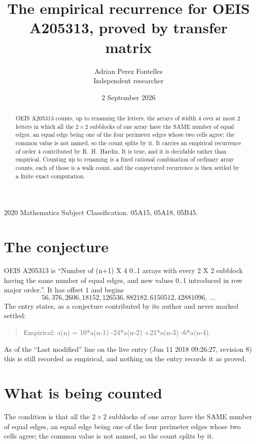 \documentclass[11pt,a4paper]{article}
\title{The empirical recurrence for OEIS A205313, proved by transfer matrix}
\author{Adrian Perez Fontelles\\ \small Independent researcher}
\date{2 September 2026}
\theoremstyle{plain}
\theoremstyle{definition}
\begin{document}
\maketitle

\begin{abstract}
OEIS A205313 counts, up to renaming the letters, the arrays of width $4$ over at most $2$
letters in which all the $2\times2$ subblocks of one array have the SAME number of equal edges, an equal edge being one of the four perimeter edges whose two cells agree; the common value is not named, so the count splits by it. It carries an empirical recurrence of order $4$ contributed by
R.~H.~Hardin. It is true, and it is decidable rather than empirical. Counting up to renaming is
a fixed rational combination of ordinary array counts, each of those is a walk count, and the
conjectured recurrence is then settled by a finite exact computation.
\end{abstract}

\noindent\small 2020 Mathematics Subject Classification. 05A15, 05A18, 05B45.\normalsize

\section{The conjecture}

OEIS A205313 is ``Number of (n+1) X 4 0..1 arrays with every 2 X 2 subblock having the same number of equal edges, and new values 0..1 introduced in row major order.''. It has offset $1$ and begins
\[
56, 376, 2606, 18152, 126536, 882182, 6150512, 42881096,\ \dots
\]
The entry states, as a conjecture contributed by its author and never marked settled:
\begin{quote}
Empirical: a(n) = 10*a(n-1) -24*a(n-2) +21*a(n-3) -6*a(n-4).
\end{quote}
As of the ``Last modified'' line on the live entry (Jun 11 2018 09:26:27, revision 8) this is still
recorded as empirical, and nothing on the entry records it as proved.

\section{What is being counted}

The condition is that all the $2\times2$ subblocks of one array have the SAME number of equal edges, an equal edge being one of the four perimeter edges whose two cells agree; the common value is not named, so the count splits by it.
\end{document}
